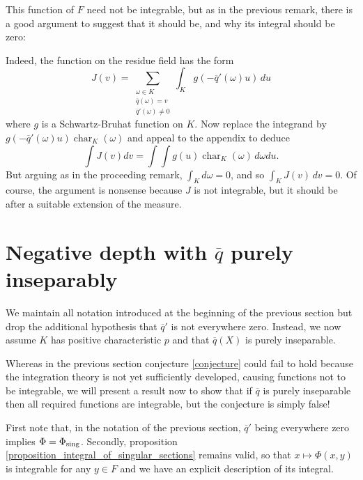 \documentclass{lmsMODIFIED}
\newcommand{\res}[1]{\overline{#1}}
\newcommand{\w}{\omega}
\newcommand{\sub}[1]{{\mbox{\scriptsize {#1}}}}
\DeclareMathOperator{\Char}{char}
\begin{document}
\begin{example}
This function of $F$ need not be integrable, but as in the previous remark, there is a good argument to suggest that it should be, and why its integral should be zero:

Indeed, the function on the residue field has the form \[J(v)=\sum_{\substack{\w\in K \\ \res{q}(\w)=v \\ \res{q}'(\w)\neq 0}}\int_K g(-\res{q}'(\w)u)\,du\] where $g$ is a Schwartz-Bruhat function on $K$. Now replace the integrand by $g(-\res{q}'(\w)u)\Char_{K}(\w)$ and appeal to the appendix to deduce \[\int J(v)dv=\int\int g(u)\Char_{K}(\w)\,d\w du.\] But arguing as in the proceeding remark, $\int_Kd\w=0$, and so $\int_K J(v)\,dv=0$. Of course, the argument is nonsense because $J$ is not integrable, but it should be after a suitable extension of the measure.
\end{example}
%
%
\section{Negative depth with $\res{q}$ purely inseparably}\label{section_purely_insep}

We maintain all notation introduced at the beginning of the previous section but drop the additional hypothesis that $\res{q}'$ is not everywhere zero. Instead, we now assume $K$ has positive characteristic $p$ and that $\res{q}(X)$ is purely inseparable.

Whereas in the previous section conjecture \ref{conjecture} could fail to hold because the integration theory is not yet sufficiently developed, causing functions not to be integrable, we will present a result now to show that if $\res{q}$ is purely inseparable then all required functions are integrable, but the conjecture is simply false!

First note that, in the notation of the previous section, $\res{q}'$ being everywhere zero implies $\Phi=\Phi_\sub{sing}$. Secondly, proposition \ref{proposition_integral_of_singular_sections} remains valid, so that $x\mapsto \Phi(x,y)$ is integrable for any $y\in F$ and we have an explicit description of its integral.
\end{document}
